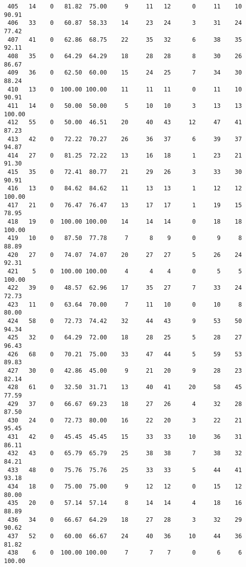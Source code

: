 \begin{verbatim}
 405   14    0   81.82  75.00     9     11   12      0     11    10    90.91
 406   33    0   60.87  58.33    14     23   24      3     31    24    77.42
 407   41    0   62.86  68.75    22     35   32      6     38    35    92.11
 408   35    0   64.29  64.29    18     28   28      8     30    26    86.67
 409   36    0   62.50  60.00    15     24   25      7     34    30    88.24
 410   13    0  100.00 100.00    11     11   11      0     11    10    90.91
 411   14    0   50.00  50.00     5     10   10      3     13    13   100.00
 412   55    0   50.00  46.51    20     40   43     12     47    41    87.23
 413   42    0   72.22  70.27    26     36   37      6     39    37    94.87
 414   27    0   81.25  72.22    13     16   18      1     23    21    91.30
 415   35    0   72.41  80.77    21     29   26      3     33    30    90.91
 416   13    0   84.62  84.62    11     13   13      1     12    12   100.00
 417   21    0   76.47  76.47    13     17   17      1     19    15    78.95
 418   19    0  100.00 100.00    14     14   14      0     18    18   100.00
 419   10    0   87.50  77.78     7      8    9      0      9     8    88.89
 420   27    0   74.07  74.07    20     27   27      5     26    24    92.31
 421    5    0  100.00 100.00     4      4    4      0      5     5   100.00
 422   39    0   48.57  62.96    17     35   27      7     33    24    72.73
 423   11    0   63.64  70.00     7     11   10      0     10     8    80.00
 424   58    0   72.73  74.42    32     44   43      9     53    50    94.34
 425   32    0   64.29  72.00    18     28   25      5     28    27    96.43
 426   68    0   70.21  75.00    33     47   44      5     59    53    89.83
 427   30    0   42.86  45.00     9     21   20      9     28    23    82.14
 428   61    0   32.50  31.71    13     40   41     20     58    45    77.59
 429   37    0   66.67  69.23    18     27   26      4     32    28    87.50
 430   24    0   72.73  80.00    16     22   20      3     22    21    95.45
 431   42    0   45.45  45.45    15     33   33     10     36    31    86.11
 432   43    0   65.79  65.79    25     38   38      7     38    32    84.21
 433   48    0   75.76  75.76    25     33   33      5     44    41    93.18
 434   18    0   75.00  75.00     9     12   12      0     15    12    80.00
 435   20    0   57.14  57.14     8     14   14      4     18    16    88.89
 436   34    0   66.67  64.29    18     27   28      3     32    29    90.62
 437   52    0   60.00  66.67    24     40   36     10     44    36    81.82
 438    6    0  100.00 100.00     7      7    7      0      6     6   100.00

\end{verbatim}
